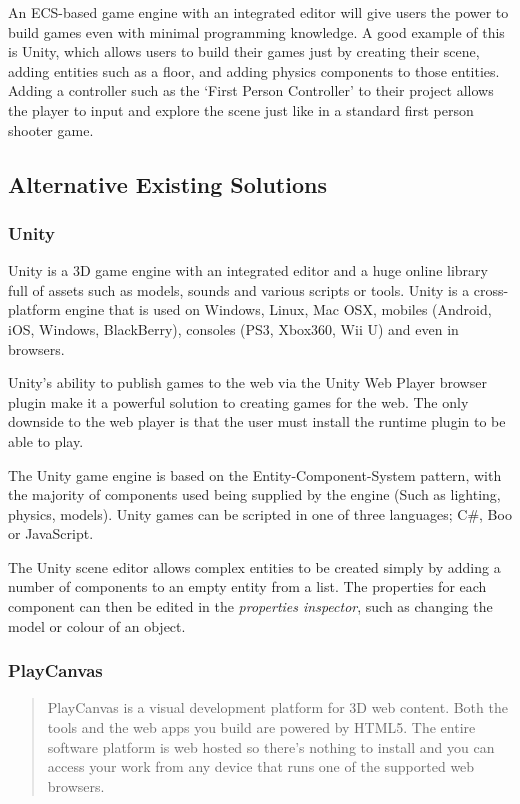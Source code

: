 \documentclass[a4paper, 12pt]{article}
\begin{document}
An ECS-based game engine with an integrated editor will give users the power to build games even with minimal programming knowledge. A good example of this is Unity, which allows users to build their games just by creating their scene, adding entities such as a floor, and adding physics components to those entities.\cite{unitycreatingscenes} Adding a controller such as the `First Person Controller' to their project allows the player to input and explore the scene just like in a standard first person shooter game.\cite{unitycharactercontrol}

\subsection{Alternative Existing Solutions}
\subsubsection{Unity}
Unity is a 3D game engine with an integrated editor and a huge online library full of assets such as models, sounds and various scripts or tools. Unity is a cross-platform engine that is used on Windows, Linux, Mac OSX, mobiles (Android, iOS, Windows, BlackBerry), consoles (PS3, Xbox360, Wii U) and even in browsers.\cite{unity}

Unity's ability to publish games to the web via the Unity Web Player browser plugin make it a powerful solution to creating games for the web. The only downside to the web player is that the user must install the runtime plugin to be able to play.\cite{unityweb}

The Unity game engine is based on the Entity-Component-System pattern, with the majority of components used being supplied by the engine (Such as lighting, physics, models).\cite{unitycomponents} Unity games can be scripted in one of three languages; C\#, Boo or JavaScript.

The Unity scene editor allows complex entities to be created simply by adding a number of components to an empty entity from a list. The properties for each component can then be edited in the \emph{properties inspector}, such as changing the model or colour of an object. \cite{unitycreatingscenes}


\subsubsection{PlayCanvas}
\begin{quote}
PlayCanvas is a visual development platform for 3D web content. Both the tools and the web apps you build are powered by HTML5. The entire software platform is web hosted so there's nothing to install and you can access your work from any device that runs one of the supported web browsers.\cite{playcanvas}
\end{quote}
\end{document}
